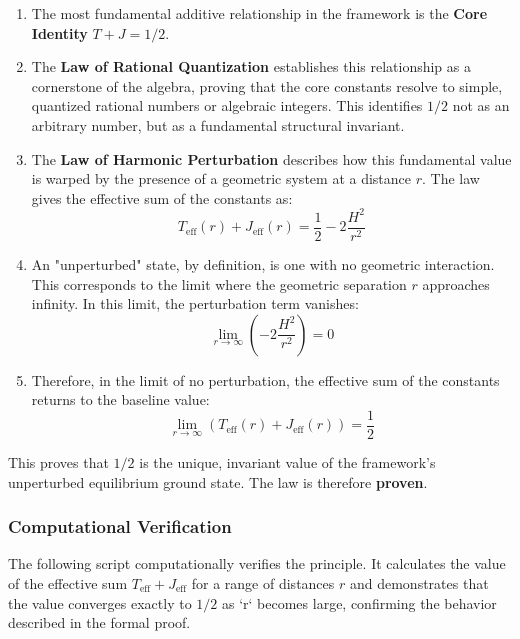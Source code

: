 \begin{enumerate}
    \item The most fundamental additive relationship in the framework is the \textbf{Core Identity} $T+J = 1/2$.

    \item The \textbf{Law of Rational Quantization} establishes this relationship as a cornerstone of the algebra, proving that the core constants resolve to simple, quantized rational numbers or algebraic integers. This identifies $1/2$ not as an arbitrary number, but as a fundamental structural invariant.

    \item The \textbf{Law of Harmonic Perturbation} describes how this fundamental value is warped by the presence of a geometric system at a distance $r$. The law gives the effective sum of the constants as:
    $$ T_{\text{eff}}(r) + J_{\text{eff}}(r) = \frac{1}{2} - 2\frac{H^2}{r^2} $$

    \item An "unperturbed" state, by definition, is one with no geometric interaction. This corresponds to the limit where the geometric separation $r$ approaches infinity. In this limit, the perturbation term vanishes:
    $$ \lim_{r\to\infty} \left( -2\frac{H^2}{r^2} \right) = 0 $$

    \item Therefore, in the limit of no perturbation, the effective sum of the constants returns to the baseline value:
    $$ \lim_{r\to\infty} \left( T_{\text{eff}}(r) + J_{\text{eff}}(r) \right) = \frac{1}{2} $$
\end{enumerate}
This proves that $1/2$ is the unique, invariant value of the framework's unperturbed equilibrium ground state. The law is therefore \textbf{proven}.

\subsubsection*{Computational Verification}
The following script computationally verifies the principle. It calculates the value of the effective sum $T_{\text{eff}} + J_{\text{eff}}$ for a range of distances $r$ and demonstrates that the value converges exactly to $1/2$ as `r` becomes large, confirming the behavior described in the formal proof.

